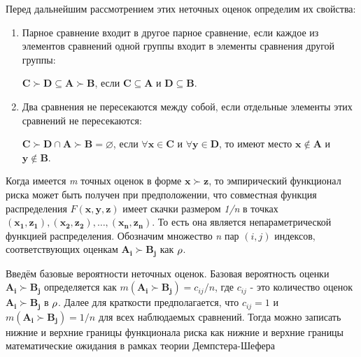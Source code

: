 \documentclass[12pt,a4paper,oneside]{article}
\begin{document}
\begin{multicols}{2}
\par
Перед дальнейшим рассмотрением этих неточных оценок определим их свойства:

\begin{enumerate}
\item Парное сравнение входит в другое парное сравнение, если каждое из элементов сравнений одной группы входит в элементы сравнения другой группы:

\begin{center}
\(\mathbf{C} \succ \mathbf{D} \subseteq \mathbf{A} \succ \mathbf{B}\), если \(\mathbf{C} \subseteq \mathbf{A}\) и \(\mathbf{D} \subseteq \mathbf{B}\).
\end{center}

\item Два сравнения не пересекаются между собой, если отдельные элементы этих сравнений не пересекаются:

\begin{center}
\(\mathbf{C} \succ \mathbf{D} \cap \mathbf{A} \succ \boldsymbol{B} = \varnothing\), если \(\forall\mathbf{x} \in \mathbf{C}\) и \(\forall\mathbf{y} \in \mathbf{D}\), то имеют место \(\mathbf{x} \notin \mathbf{A}\) и \(\mathbf{y} \notin \mathbf{B}\).
\end{center}

\end{enumerate}

\par 
Когда имеется \emph{m} точных оценок в форме \(\mathbf{x} \succ \mathbf{z}\), то эмпирический функционал риска может быть получен при предположении, что совместная функция распределения \(F(\mathbf{x}, \mathbf{y}, \mathbf{z})\) имеет скачки размером \emph{1/n} в точках \((\mathbf{x_1}, \mathbf{z_1}), (\mathbf{x_2}, \mathbf{z_2}), \dots, (\mathbf{x_n}, \mathbf{z_n})\). 
То есть она является непараметрической функцией распределения. 
Обозначим множество \emph{n} пар \((i, j)\) индексов, соответствующих оценкам \(\mathbf{A_i} \succ \mathbf{B_j}\) как \(\mathrm{\rho}\). 

\par
Введём базовые вероятности неточных оценок. 
Базовая вероятность оценки \(\mathbf{A_i} \succ \mathbf{B_j}\) определяется как \(m(\mathbf{A_i} \succ \mathbf{B_j}) = c_{ij} / n\), где \(c_{ij}\) - это количество оценок \(\mathbf{A_i} \succ \mathbf{B_j}\) в \(\mathrm{\rho}\). 
Далее для краткости предполагается, что \(c_{ij} = 1\) и \(m(\mathbf{A_i} \succ \mathbf{B_j}) = 1/n\) для всех наблюдаемых сравнений. 
Тогда можно записать нижние и верхние границы функционала риска как нижние и верхние границы математические ожидания в рамках теории Демпстера-Шефера


\end{multicols}
\end{document}
